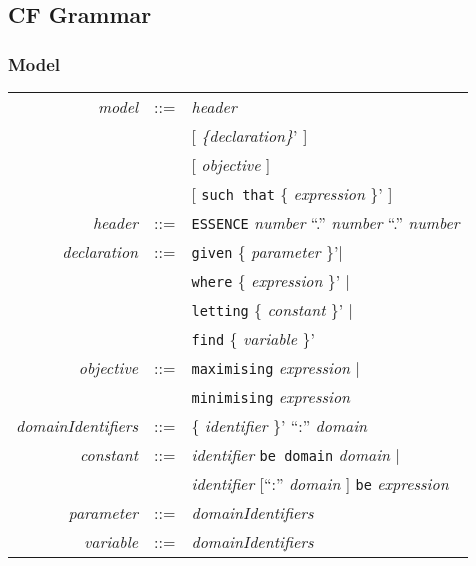 \documentclass{article}
\begin{document}
\subsection{CF Grammar}

\subsubsection{Model}


\begin{tabular}{rcl}

\textit{model} & ::= & \textit{header}\\
               &     & [ \textit{ \{declaration\}}' ] \\
               &     & [ \textit{objective} ] \\
               &     & [ \texttt{such that} \{ \textit{expression} \}' ] \\

 \textit{header}& ::= & \texttt{ESSENCE} \textit{number} ``.'' \textit{number} ``.'' \textit{number} \\

\textit{declaration} & ::= & \texttt{given} \{ \textit{parameter} \}'$\mid$ \\
                     &     & \texttt{where} \{ \textit{expression} \}' $\mid$ \\
                     &     & \texttt{letting} \{ \textit{constant} \}' $\mid$\\
                     &     & \texttt{find} \{ \textit{variable} \}'\\

\textit{objective} & ::= & \texttt{maximising} \textit{expression} $\mid$ \\
                   &     & \texttt{minimising} \textit{expression} \\

\textit{domainIdentifiers} & ::= & \{ \textit{identifier} \}' ``:'' \textit{domain} \\

\textit{constant}  & ::=  & \textit{identifier}  \texttt{be domain} \textit{domain} $\mid$ \\
                           & & \textit{identifier} [``:'' \textit{domain} ] \texttt{be} \textit{expression} \\
\textit{parameter} & ::= & \textit{domainIdentifiers} \\
\textit{variable}  & ::= & \textit{domainIdentifiers}\\ 

\end{tabular}
\end{document}
